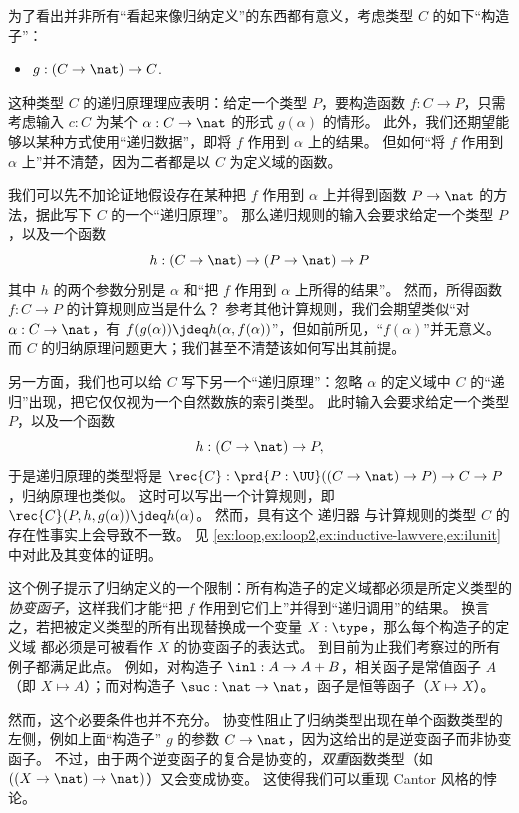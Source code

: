为了看出并非所有“看起来像归纳定义”的东西都有意义，考虑类型 $C$ 的如下“构造子”：
\begin{itemize}
\item $g:(C\to \nat) \to C$.
\end{itemize}
这种类型 $C$ 的递归原理理应表明：给定一个类型 $P$，要构造函数 $f:C\to P$，只需考虑输入 $c:C$ 为某个 $\alpha:C\to\nat$ 的形式 $g(\alpha)$ 的情形。
此外，我们还期望能够以某种方式使用“递归数据”，即将 $f$ 作用到 $\alpha$ 上的结果。
但如何“将 $f$ 作用到 $\alpha$ 上”并不清楚，因为二者都是以 $C$ 为定义域的函数。

我们可以先不加论证地假设存在某种把 $f$ 作用到 $\alpha$ 上并得到函数 $P\to\nat$ 的方法，据此写下 $C$ 的一个“递归原理”。
那么递归规则的输入会要求给定一个类型 $P$，以及一个函数
\begin{equation}
  h:(C\to\nat) \to (P\to\nat) \to P\label{eq:fake-recursor}
\end{equation}
其中 $h$ 的两个参数分别是 $\alpha$ 和“把 $f$ 作用到 $\alpha$ 上所得的结果”。
然而，所得函数 $f:C\to P$ 的计算规则应当是什么？
参考其他计算规则，我们会期望类似“对 $\alpha:C\to\nat$，有 $f(g(\alpha)) \jdeq h(\alpha,f(\alpha))$”，但如前所见，“$f(\alpha)$”并无意义。
而 $C$ 的归纳原理问题更大；我们甚至不清楚该如何写出其前提。

另一方面，我们也可以给 $C$ 写下另一个“递归原理”：忽略 $\alpha$ 的定义域中 $C$ 的“递归”出现，把它仅仅视为一个自然数族的索引类型。
此时输入会要求给定一个类型 $P$，以及一个函数
\begin{equation*}
  h:(C\to \nat) \to P,
\end{equation*}
于是递归原理的类型将是 $\rec{C}:\prd{P:\UU} ((C\to \nat) \to P) \to C\to P$，归纳原理也类似。
这时可以写出一个计算规则，即 $\rec{C}(P,h,g(\alpha))\jdeq h(\alpha)$。
然而，具有这个 递归器 与计算规则的类型 $C$ 的存在性事实上会导致不一致。
见 \cref{ex:loop,ex:loop2,ex:inductive-lawvere,ex:ilunit} 中对此及其变体的证明。

这个例子提示了归纳定义的一个限制：所有构造子的定义域都必须是所定义类型的\emph{协变函子}，这样我们才能“把 $f$ 作用到它们上”并得到“递归调用”的结果。
换言之，若把被定义类型的所有出现替换成一个变量
%
$X:\type$，那么每个构造子的定义域
%
都必须是可被看作 $X$ 的协变函子的表达式。
到目前为止我们考察过的所有例子都满足此点。
例如，对构造子 $\inl:A\to A+B$，相关函子是常值函子 $A$（即 $X\mapsto A$）；而对构造子 $\suc:\nat\to\nat$，函子是恒等函子（$X\mapsto X$）。

然而，这个必要条件也并不充分。
协变性阻止了归纳类型出现在单个函数类型的左侧，例如上面“构造子” $g$ 的参数 $C\to\nat$，因为这给出的是逆变函子而非协变函子。
不过，由于两个逆变函子的复合是协变的，\emph{双重}函数类型（如 $((X\to \nat)\to \nat)$）又会变成协变。
这使得我们可以重现 Cantor 风格的悖论。

